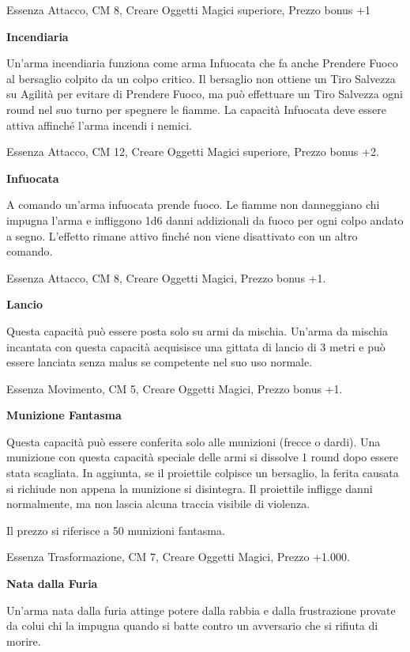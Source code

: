 \documentclass[a4paper,11pt,twoside,openany]{book}
\begin{document}
Essenza Attacco, CM 8, Creare Oggetti Magici superiore, Prezzo bonus +1

\textbf{Incendiaria}

Un'arma incendiaria funziona come arma Infuocata che fa anche Prendere Fuoco al bersaglio colpito da un colpo critico. Il bersaglio non ottiene un Tiro Salvezza su Agilità per evitare di Prendere Fuoco, ma può effettuare un Tiro Salvezza ogni round nel suo turno per spegnere le fiamme. La capacità Infuocata deve essere attiva affinché l'arma incendi i nemici.

Essenza Attacco, CM 12, Creare Oggetti Magici superiore, Prezzo bonus +2.

\textbf{Infuocata}

A comando un'arma infuocata prende fuoco. Le fiamme non danneggiano chi impugna l'arma e infliggono 1d6 danni addizionali da fuoco per ogni colpo andato a segno. L'effetto rimane attivo finché non viene disattivato con un altro comando.

Essenza Attacco, CM 8, Creare Oggetti Magici, Prezzo bonus +1.

\textbf{Lancio}

Questa capacità può essere posta solo su armi da mischia. Un'arma da mischia incantata con questa capacità acquisisce una gittata di lancio di 3 metri e può essere lanciata senza malus se competente nel suo uso normale.

Essenza Movimento, CM 5, Creare Oggetti Magici, Prezzo bonus +1.

\textbf{Munizione Fantasma}

Questa capacità può essere conferita solo alle munizioni (frecce o dardi). Una munizione con questa capacità speciale delle armi si dissolve 1 round dopo essere stata scagliata. In aggiunta, se il proiettile colpisce un bersaglio, la ferita causata si richiude non appena la munizione si disintegra. Il proiettile infligge danni normalmente, ma non lascia alcuna traccia visibile di violenza.

Il prezzo si riferisce a 50 munizioni fantasma.

Essenza Trasformazione, CM 7, Creare Oggetti Magici, Prezzo +1.000.

\textbf{Nata dalla Furia}

Un'arma nata dalla furia attinge potere dalla rabbia e dalla frustrazione provate da colui chi la impugna quando si batte contro un avversario che si rifiuta di morire.
\end{document}
